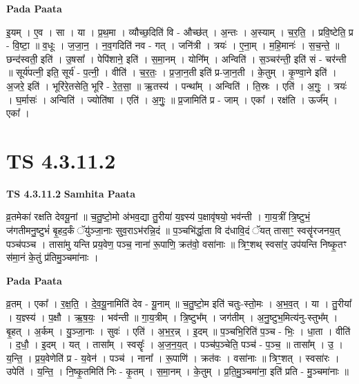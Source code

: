 \documentclass[17pt]{extarticle}
\begin{document}
\textbf{Pada Paata} \newline

इ॒यम् । ए॒व । सा । या । प्र॒थ॒मा । व्यौच्छ॒दिति॑ वि - औच्छ॑त् । अ॒न्तः । अ॒स्याम् । च॒र॒ति॒ । प्रवि॒ष्टेति॒ प्र - वि॒ष्टा॒ ॥ व॒धूः । ज॒जा॒न॒ । न॒व॒गदिति॑ नव - गत् । जनि॑त्री । त्रयः॑ । ए॒ना॒म् । म॒हि॒मानः॑ । स॒च॒न्ते॒ ॥ छन्द॑स्वती॒ इति॑ । उ॒षसा᳚ । पेपि॑शाने॒ इति॑ । स॒मा॒नम् । योनि᳚म् । अन्विति॑ । स॒ञ्चर॑न्ती॒ इति॑ सं - चर॑न्ती ॥ सूर्य॑पत्नी॒ इति॒ सूर्य॑ - प॒त्नी॒ । वीति॑ । च॒र॒तः॒ । प्र॒जा॒न॒ती इति॑ प्र-जा॒न॒ती । के॒तुम् । कृ॒ण्वा॒ने इति॑ । अ॒जरे॒ इति॑ । भूरि॑रे॒तसेति॒ भूरि॑ - रे॒त॒सा॒ ॥ ऋ॒तस्य॑ । पन्था᳚म् । अन्विति॑ । ति॒स्रः । एति॑ । अ॒गुः॒ । त्रयः॑ । घ॒र्मासः॑ । अन्विति॑ । ज्योति॑षा । एति॑ । अ॒गुः॒ ॥ प्र॒जामिति॑ प्र - जाम् । एका᳚ । रक्ष॑ति । ऊर्ज᳚म् । एका᳚ ।  \newline





\section{ TS 4.3.11.2 }

\textbf{TS 4.3.11.2 } \newline
\textbf{Samhita Paata} \newline

व्र॒तमेका॑ रक्षति देवयू॒नां ॥ च॒तु॒ष्टो॒मो अ॑भव॒द्या तु॒रीया॑ य॒ज्ञ्स्य॑ प॒क्षावृ॑षयो॒ भव॑न्ती । गा॒य॒त्रीं त्रि॒ष्टुभं॒ ज॑गतीमनु॒ष्टुभं॑ बृ॒हद॒र्कं ॅयु॑ञ्जा॒नाः सुव॒राऽभ॑रन्नि॒दं ॥ प॒ञ्चभि॑र्द्धा॒ता वि द॑धावि॒दं ॅयत् तासाꣳ॒॒ स्वसॄ॑रजनय॒त् पञ्च॑पञ्च । तासा॑मु यन्ति प्रय॒वेण॒ पञ्च॒ नाना॑ रू॒पाणि॒ क्रत॑वो॒ वसा॑नाः ॥ त्रिꣳ॒॒शथ् स्वसा॑र॒ उप॑यन्ति निष्कृ॒तꣳ स॑मा॒नं के॒तुं प्र॑तिमु॒ञ्चमा॑नाः । \newline

\textbf{Pada Paata} \newline

व्र॒तम् । एका᳚ । र॒क्ष॒ति॒ । दे॒व॒यू॒नामिति॑ देव - यू॒नाम् ॥ च॒तु॒ष्टो॒म इति॑ चतुः-स्तो॒मः । अ॒भ॒व॒त् । या । तु॒रीया᳚ । य॒ज्ञ्स्य॑ । प॒क्षौ । ऋ॒ष॒यः॒ । भव॑न्ती ॥ गा॒य॒त्रीम् । त्रि॒ष्टुभ᳚म् । जग॑तीम् । अ॒नु॒ष्टुभ॒मित्य॑नु-स्तुभ᳚म् । बृ॒हत् । अ॒र्कम् । यु॒ञ्जा॒नाः । सुवः॑ । एति॑ । अ॒भ॒र॒न्न् । इ॒दम् ॥ प॒ञ्चभि॒रिति॑ प॒ञ्च - भिः॒ । धा॒ता । वीति॑ । द॒धौ॒ । इ॒दम् । यत् । तासा᳚म् । स्वसॄः᳚ । अ॒ज॒न॒य॒त् । पञ्च॑प॒ञ्चेति॒ पञ्च॑ - प॒ञ्च॒ ॥ तासा᳚म् । उ॒ । य॒न्ति॒ । प्र॒य॒वेणेति॑ प्र - य॒वेन॑ । पञ्च॑ । नाना᳚ । रू॒पाणि॑ । क्रत॑वः । वसा॑नाः ॥ त्रिꣳ॒॒शत् । स्वसा॑रः । उपेति॑ । य॒न्ति॒ । नि॒ष्कृ॒तमिति॑ निः - कृ॒तम् । स॒मा॒नम् । के॒तुम् । प्र॒ति॒मु॒ञ्चमा॑ना॒ इति॑ प्रति - मु॒ञ्चमा॑नाः ॥  \newline
\end{document}
